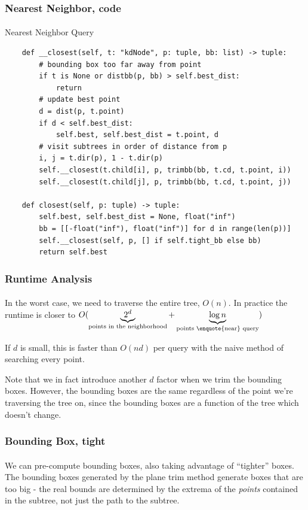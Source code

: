 \documentclass{beamer}                             %
\begin{document}
\begin{frame}[fragile]
\frametitle{Nearest Neighbor, code}
\framesubtitle{}
\begin{algorithm}[H]
  \caption{Nearest Neighbor Query}
  \begin{verbatim}
    def __closest(self, t: "kdNode", p: tuple, bb: list) -> tuple:
        # bounding box too far away from point 
        if t is None or distbb(p, bb) > self.best_dist:
            return
        # update best point
        d = dist(p, t.point)
        if d < self.best_dist:
            self.best, self.best_dist = t.point, d
        # visit subtrees in order of distance from p
        i, j = t.dir(p), 1 - t.dir(p)
        self.__closest(t.child[i], p, trimbb(bb, t.cd, t.point, i))
        self.__closest(t.child[j], p, trimbb(bb, t.cd, t.point, j))

    def closest(self, p: tuple) -> tuple:
        self.best, self.best_dist = None, float("inf")
        bb = [[-float("inf"), float("inf")] for d in range(len(p))]
        self.__closest(self, p, [] if self.tight_bb else bb)
        return self.best
  \end{verbatim}
\end{algorithm}
\end{frame}

\begin{frame}
\frametitle{Runtime Analysis}
\framesubtitle{}
In the worst case, we need to traverse the entire tree, \( O(n) \).
In practice the runtime is closer to
\( O(\underbrace{2^d}_{\text{points in the neighborhood}} + 
\underbrace{\log n}_{\text{points \enquote{near} query}}) \)

If \( d \) is small, this is faster than \( O(nd) \) per query with the naive
method of searching every point. \pause

Note that we in fact introduce another \( d \) factor when we trim the bounding
boxes. However, the bounding boxes are the same regardless of the point we're
traversing the tree on, since the bounding boxes are a function of the tree
which doesn't change.
\end{frame}

\begin{frame}
\frametitle{Bounding Box, tight}
\framesubtitle{}
We can pre-compute bounding boxes, also taking advantage of \enquote{tighter}
boxes. The bounding boxes generated by the plane trim method generate boxes
that are too big - the real bounds are determined by the extrema of the 
\textit{points} contained in the subtree, not just the path to the subtree.
\pause
\end{frame}
\end{document}
